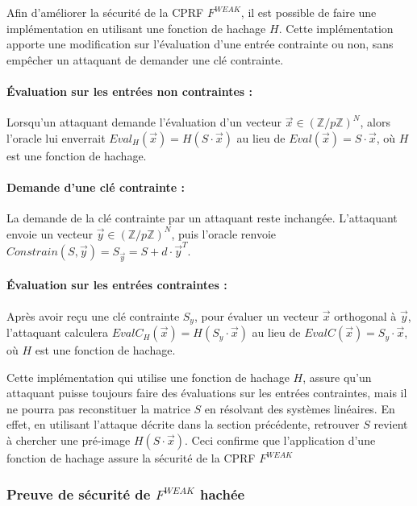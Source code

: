\documentclass[9pt]{extarticle}
\begin{document}
Afin d'améliorer la sécurité de la CPRF $F^{WEAK}$, il est possible de faire une implémentation en utilisant une fonction de hachage $H$. Cette implémentation apporte une modification sur l'évaluation d'une entrée contrainte ou non, sans empêcher un attaquant de demander une clé contrainte.

\paragraph{\'{E}valuation sur les entrées non contraintes : }Lorsqu'un attaquant demande l'évaluation d'un vecteur $\vec{x} \in (\mathbb{Z}/p\mathbb{Z})^N$, alors l'oracle lui enverrait $Eval_H(\vec{x}) = H(S \cdot \vec{x})$ au lieu de $Eval(\vec{x}) = S \cdot \vec{x}$, où $H$ est une fonction de hachage.

\paragraph{Demande d'une clé contrainte : }La demande de la clé contrainte par un attaquant reste inchangée. L'attaquant envoie un vecteur $\vec{y} \in (\mathbb{Z}/p\mathbb{Z})^N$, puis l'oracle renvoie $Constrain(S, \vec{y}) = S_{\vec{y}} = S + d \cdot \vec{y}^T$.

\paragraph{\'{E}valuation sur les entrées contraintes : }Après avoir reçu une clé contrainte $S_y$, pour évaluer un vecteur $\vec{x}$ orthogonal à $\vec{y}$, l'attaquant calculera $EvalC_H(\vec{x}) = H(S_y \cdot \vec{x})$ au lieu de $EvalC(\vec{x}) = S_y \cdot \vec{x}$, où $H$ est une fonction de hachage.

Cette implémentation qui utilise une fonction de hachage $H$, assure qu'un attaquant puisse toujours faire des évaluations sur les entrées contraintes, mais il ne pourra pas reconstituer la matrice $S$ en résolvant des systèmes linéaires. En effet, en utilisant l'attaque décrite dans la section précédente, retrouver $S$ revient à chercher une pré-image $H(S \cdot \vec{x})$. Ceci confirme que l'application d'une fonction de hachage assure la sécurité de la CPRF $F^{WEAK}$


\subsubsection{Preuve de sécurité de $F^{WEAK}$ hachée}
\end{document}

